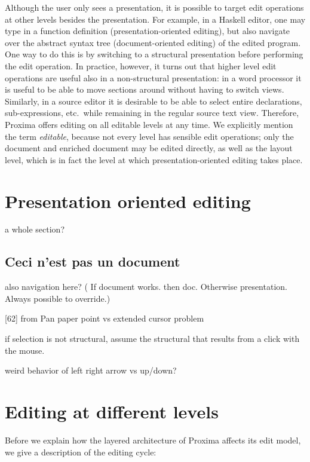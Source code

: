 Although the user only sees a presentation, it is possible to target edit operations at other levels besides the presentation. For example, in a Haskell editor, one may type in a function definition (presentation-oriented editing), but also navigate over the abstract syntax tree (document-oriented editing) of the edited program. One way to do this is by switching to a structural presentation before performing the edit operation. In practice, however, it turns out that higher level edit operations are useful also in a non-structural presentation: in a word processor it is useful to be able to move sections around without having to switch views. Similarly, in a source editor it is desirable to be able to select entire declarations, sub-expressions, etc.\ while remaining in the regular source text view. Therefore, Proxima offers editing on all editable levels at any time. We explicitly mention the term {\em editable}, because not every level has sensible edit operations; only the document and enriched document may be edited directly, as well as the layout level, which is in fact the level at which presentation-oriented editing takes place.

\bc
\section{Presentation oriented editing}
a whole section?

\subsection{Ceci n'est pas un document}

also navigation here? ( If document works. then doc. Otherwise presentation. Always  possible to override.)

[62] from Pan paper point vs extended cursor problem

if selection is not structural, assume the structural that results from a click with the mouse.

weird behavior of left right arrow vs up/down? 
\ec


%																
%																
%																
\section{Editing at different levels} \label{sect:editDifferentLevels}

Before we explain how the layered architecture of Proxima affects its edit model, we give a description of the editing cycle:

